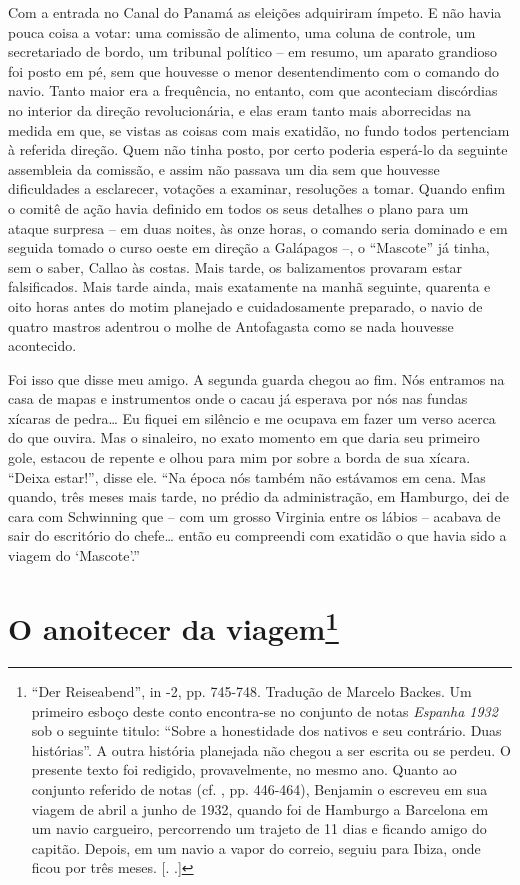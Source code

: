 Com a entrada no Canal do Panamá as eleições adquiriram ímpeto. E não
havia pouca coisa a votar: uma comissão de alimento, uma coluna de
controle, um secretariado de bordo, um tribunal político -- em resumo,
um aparato grandioso foi posto em pé, sem que houvesse o menor
desentendimento com o comando do navio. Tanto maior era a frequência, no
entanto, com que aconteciam discórdias no interior da direção
revolucionária, e elas eram tanto mais aborrecidas na medida em que, se
vistas as coisas com mais exatidão, no fundo todos pertenciam à referida
direção. Quem não tinha posto, por certo poderia esperá-lo da seguinte
assembleia da comissão, e assim não passava um dia sem que houvesse
dificuldades a esclarecer, votações a examinar, resoluções a tomar.
Quando enfim o comitê de ação havia definido em todos os seus detalhes o
plano para um ataque surpresa -- em duas noites, às onze horas, o
comando seria dominado e em seguida tomado o curso oeste em direção a
Galápagos --, o ``Mascote'' já tinha, sem o saber, Callao às costas.
Mais tarde, os balizamentos provaram estar falsificados. Mais tarde
ainda, mais exatamente na manhã seguinte, quarenta e oito horas antes do
motim planejado e cuidadosamente preparado, o navio de quatro mastros
adentrou o molhe de Antofagasta como se nada houvesse acontecido.

Foi isso que disse meu amigo. A segunda guarda chegou ao fim. Nós
entramos na casa de mapas e instrumentos onde o cacau já esperava por
nós nas fundas xícaras de pedra\ldots{} Eu fiquei em silêncio e me ocupava em
fazer um verso acerca do que ouvira. Mas o sinaleiro, no exato momento
em que daria seu primeiro gole, estacou de repente e olhou para mim por
sobre a borda de sua xícara. ``Deixa estar!'', disse ele. ``Na época nós
também não estávamos em cena. Mas quando, três meses mais tarde, no
prédio da administração, em Hamburgo, dei de cara com Schwinning que --
com um grosso Virginia entre os lábios -- acabava de sair do escritório
do chefe\ldots{} então eu compreendi com exatidão o que havia sido a viagem
do `Mascote'.''

\chapter{O anoitecer da viagem\footnote[*]{``Der Reiseabend'', in  -2, pp.
  745-748. Tradução de Marcelo Backes. Um primeiro esboço deste conto
  encontra-se no conjunto de notas \emph{Espanha 1932} sob o seguinte
  titulo: ``Sobre a honestidade dos nativos e seu contrário. Duas
  histórias''. A outra história planejada não chegou a ser escrita ou se
  perdeu. O presente texto foi redigido, provavelmente, no mesmo ano.
  Quanto ao conjunto referido de notas (cf.  , pp. 446-464),
  Benjamin o escreveu em sua viagem de abril a junho de 1932, quando foi
  de Hamburgo a Barcelona em um navio cargueiro, percorrendo um trajeto
  de 11 dias e ficando amigo do capitão. Depois, em um navio a vapor do
  correio, seguiu para Ibiza, onde ficou por três meses. [. .]} }

